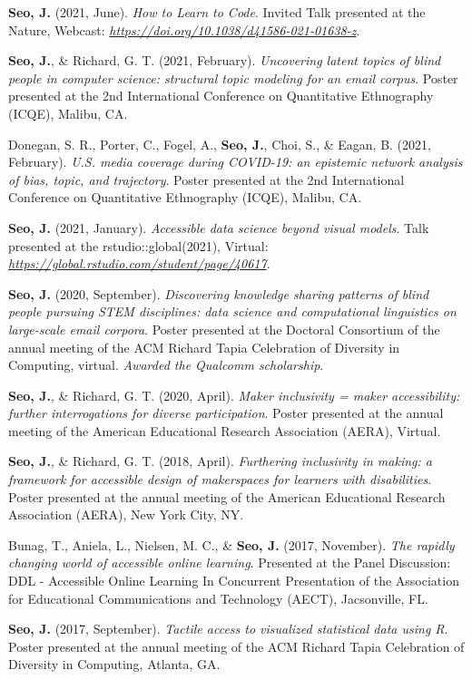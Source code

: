 \documentclass[11pt,a4paper,]{awesome-cv}
\begin{document}
\textbf{Seo, J.} (2021, June). \emph{How to Learn to Code}. Invited Talk
presented at the Nature, Webcast:
\emph{\url{https://doi.org/10.1038/d41586-021-01638-z}}.

\textbf{Seo, J.}, \& Richard, G. T. (2021, February). \emph{Uncovering
latent topics of blind people in computer science: structural topic
modeling for an email corpus}. Poster presented at the 2nd International
Conference on Quantitative Ethnography (ICQE), Malibu, CA.

Donegan, S. R., Porter, C., Fogel, A., \textbf{Seo, J.}, Choi, S., \&
Eagan, B. (2021, February). \emph{U.S. media coverage during COVID-19:
an epistemic network analysis of bias, topic, and trajectory}. Poster
presented at the 2nd International Conference on Quantitative
Ethnography (ICQE), Malibu, CA.

\textbf{Seo, J.} (2021, January). \emph{Accessible data science beyond
visual models}. Talk presented at the rstudio::global(2021), Virtual:
\emph{\url{https://global.rstudio.com/student/page/40617}}.

\textbf{Seo, J.} (2020, September). \emph{Discovering knowledge sharing
patterns of blind people pursuing STEM disciplines: data science and
computational linguistics on large-scale email corpora}. Poster
presented at the Doctoral Consortium of the annual meeting of the ACM
Richard Tapia Celebration of Diversity in Computing, virtual.
\emph{Awarded the Qualcomm scholarship}.

\textbf{Seo, J.}, \& Richard, G. T. (2020, April). \emph{Maker
inclusivity = maker accessibility: further interrogations for diverse
participation}. Poster presented at the annual meeting of the American
Educational Research Association (AERA), Virtual.

\textbf{Seo, J.}, \& Richard, G. T. (2018, April). \emph{Furthering
inclusivity in making: a framework for accessible design of makerspaces
for learners with disabilities}. Poster presented at the annual meeting
of the American Educational Research Association (AERA), New York City,
NY.

Bunag, T., Aniela, L., Nielsen, M. C., \& \textbf{Seo, J.} (2017,
November). \emph{The rapidly changing world of accessible online
learning}. Presented at the Panel Discussion: DDL - Accessible Online
Learning In Concurrent Presentation of the Association for Educational
Communications and Technology (AECT), Jacsonville, FL.

\textbf{Seo, J.} (2017, September). \emph{Tactile access to visualized
statistical data using R}. Poster presented at the annual meeting of the
ACM Richard Tapia Celebration of Diversity in Computing, Atlanta, GA.
\end{document}
